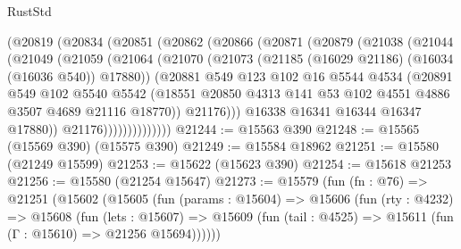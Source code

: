 \begin{lexlean}{RustStd}
\begin{coremodule}
              (@20819
                (@20834
                  (@20851
                    (@20862
                      (@20866
                        (@20871
                          (@20879
                            (@21038
                              (@21044
                                (@21049
                                  (@21059
                                    (@21064
                                      (@21070
                                        (@21073
                                          (@21185 (@16029 @21186) (@16034 (@16036 @540)) @17880))
                                        (@20881
                                          @549
                                          @123
                                          @102
                                          @16
                                          @5544
                                          @4534
                                          (@20891
                                            @549
                                            @102
                                            @5540
                                            @5542
                                            (@18551
                                              @20850
                                              @4313
                                              @141
                                              @53
                                              @102
                                              @4551
                                              @4886
                                              @3507
                                              @4689
                                              @21116
                                              @18770))
                                          @21176)))
                                    @16338
                                    @16341
                                    @16344
                                    @16347
                                    @17880))
                                @21176))))))))))))))
@21244 := @15563 @390
@21248 := @15565 (@15569 @390) (@15575 @390)
@21249 := @15584 @18962
@21251 := @15580 (@21249 @15599)
@21253 := @15622 (@15623 @390)
@21254 := @15618 @21253
@21256 := @15580 (@21254 @15647)
@21273 := @15579
    (fun (fn : @76) =>
    @21251
      (@15602
        (@15605
          (fun (params : @15604) =>
          @15606
            (fun (rty : @4232) =>
            @15608
              (fun (lets : @15607) =>
              @15609 (fun (tail : @4525) => @15611 (fun (Γ : @15610) => @21256 @15694))))))

\end{coremodule}
\end{lexlean}
